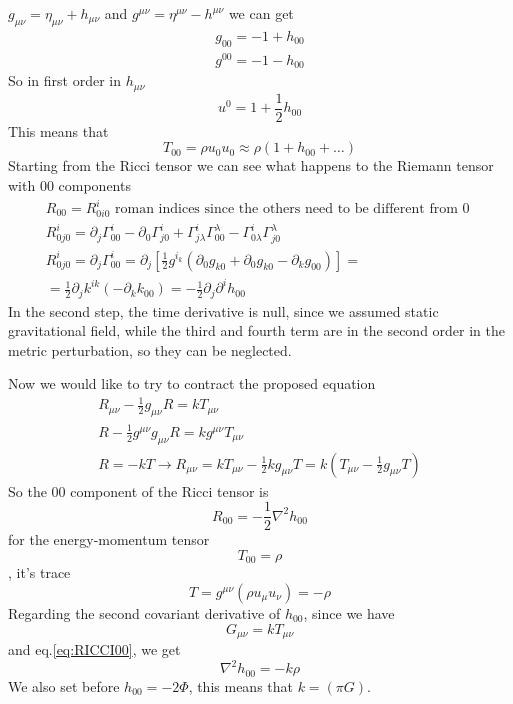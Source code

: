 $g_{\mu \nu } = \eta _{\mu \nu } + h_{\mu \nu }$ and $g^{\mu \nu } = \eta ^{\mu \nu } - h^{\mu \nu }$ we can get
\begin{gather*}
g_{00} = -1 + h_{00} \\
g^{00} = -1 - h_{00}
\end{gather*}
So in first order in $h_{\mu \nu }$
\begin{equation}
u^{0} = 1+ \frac{1}{2}h_{00}
\end{equation}
This means that
\begin{equation}
T_{00} = \rho u_{0}u_{0} \approx \rho \left( 1+ h_{00} + \ldots  \right)	
\end{equation}
Starting from the Ricci tensor we can see what happens to the Riemann tensor with 00 components
\begin{gather*}
R_{00} = R^{i}_{0i0}  \text{ roman indices since the others need to be different from 0 }\\
R^{i}_{0j0} = \partial_{j}\Gamma ^{i}_{00} - \partial_{0}\Gamma ^{i}_{j0} + \Gamma ^{i}_{j\lambda }\Gamma ^{\lambda }_{00} - \Gamma ^{i}_{0\lambda }\Gamma ^{\lambda }_{j0} \\
R^{i}_{0j0} = \partial_{j}\Gamma ^{i}_{00} = \partial_{j} \left[\frac{1}{2} g^{i_k} \left( \partial_{0}g_{k0}+ \partial_{0}g_{k0}- \partial_{k}g_{00} \right)\right] = \\
= \frac{1}{2} \partial_{j}k^{ik} \left( -\partial_{k}k_{00} \right) = - \frac{1}{2} \partial_{j} \partial^{i}h_{00}
\end{gather*}
In the second step, the time derivative is null, since we assumed static gravitational field, while the third and fourth term are in the second order in the metric perturbation, so they can be neglected.\par
Now we would like to try to contract the proposed equation
\begin{gather*}
R_{\mu \nu } - \frac{1}{2} g_{\mu \nu } R = k T_{\mu \nu } \\
R - \frac{1}{2} g^{\mu \nu } g_{\mu \nu }R = k g^{\mu \nu }T_{\mu \nu }\\
R = -kT
\to  R_{\mu \nu } = kT_{\mu \nu } - \frac{1}{2} kg_{\mu \nu }T = k \left( T_{\mu \nu } - \frac{1}{2} g_{\mu \nu } T \right)
\end{gather*}
So the 00 component of the Ricci tensor is 
\begin{equation}\label{eq:RICCI00}
R_{00} = -\frac{1}{2} \nabla ^{2}h_{00}
\end{equation}
for the energy-momentum tensor
\begin{equation}
T_{00} = \rho 
\end{equation},
it's trace
\begin{equation}
T = g^{\mu \nu } \left( \rho u_{\mu } u_{\nu }\right) = -\rho 
\end{equation}
Regarding the second covariant derivative of $h_{00}$, since we have
\[
	G_{\mu \nu } = k T_{\mu \nu }
\]
and eq.\ref{eq:RICCI00}, we get
\begin{equation}
\nabla ^{2}h_{00} = -k\rho 
\end{equation}
We also set before $h_{00} = -2 \Phi $, this means that $k = \left( \pi G \right)$.\par

